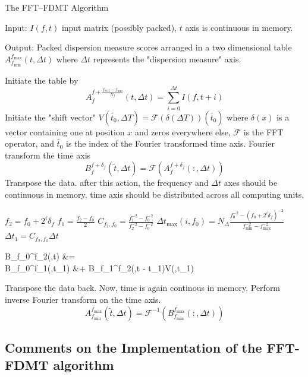 \documentclass[iop]{emulateapj}
\begin{document}
\begin{algorithm}[H]
\caption{The FFT--FDMT Algorithm}
\label{FDMTFFT}
Input: $I(f,t)$ input matrix (possibly packed), $t$ axis is continuous in memory.

Output: Packed dispersion measure scores arranged in a two dimensional table  $A_{f_{\min}}^{f_{\max}}(t,\Delta t)$ where $\Delta t$ represents the "dispersion measure" axis.
\begin{algorithmic}[1]
  \STATE Initiate the table by  $$ A_{f}^{f + \frac{f_{\max} - f_{\min}}{N_f}}(t,\Delta t) = \sum_{i=0}^{\Delta t}{I(f,t+i)}$$
  \STATE Initiate the "shift vector" $V(\tilde{t_0},\Delta T) = \mathcal{F}(\delta(\Delta T))(\tilde{t_0})$ where $\delta(x)$ is a vector containing one at position $x$ and zeros everywhere else, $\mathcal{F}$ is the FFT operator, and $\tilde{t_0}$ is the index of the Fourier transformed time axis. 
  \STATE Fourier transform the time axis $$ B_{f}^{f + \delta_f}(\tilde{t},\Delta t) = \mathcal{F}(A_{f}^{f + \delta_f}(:,\Delta t))$$
  \STATE Transpose the data. after this action, the frequency and $\Delta t$ axes should be continuous in memory, time axis should be distributed across all computing units.
   
  \STATE $f_2 = f_0 + 2^i\delta_f$
  \STATE $f_1 = \frac{f_2 - f_0}{2}$
  \STATE $C_{f_2,f_0} = \frac{f_1^{-2} - f_0^{-2}}{f_2^{-2} - f_0^{-2}}$
  \STATE $\Delta t_{\max}(i,f_0) = N_\Delta \frac{f_0^{-2} - (f_0 + 2^i\delta_f)^{-2}} {f_{\min}^{-2} - f_{\max}^{-2}} $
  \STATE $\Delta t_1 = C_{f_2,f_0}\Delta t$
  \STATE
  \begin{flalign*}
  B_{f_0}^{f_2}(,\Delta t) &= \\ B_{f_0}^{f_1}(,\Delta t_1) &+ B_{f_1}^{f_2}(,\Delta t - \Delta t_1)V(,\Delta t_1)
  \end{flalign*}
  \ENDFOR
  \ENDFOR
  \ENDFOR 
  \ENDFOR
  \STATE Transpose the data back. Now, time is again continous in memory.
  \STATE Perform inverse Fourier transform on the time axis. $$ A_{f_{\min}}^{f_{\max}}(\tilde{t},\Delta t) = \mathcal{F}^{-1}(B_{f_{\min}}^{f_{\max}}(:,\Delta t))$$
\end{algorithmic}
\end{algorithm}

\subsection{Comments on the Implementation of the FFT-FDMT algorithm}
\end{document}
